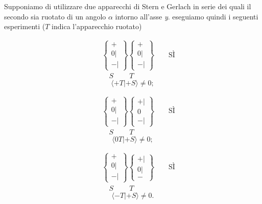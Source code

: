 Supponiamo di utilizzare due apparecchi di Stern e Gerlach in serie dei quali il secondo sia ruotato di un angolo $\alpha$ intorno all'asse \emph{y}. eseguiamo quindi i seguenti esperimenti ($T$ indica l'apparecchio ruotato)


\begin{eqnarray}
& &\begin{Bmatrix}
 + \\ 0 | \\ - |  
\end{Bmatrix}
\begin{Bmatrix}
 + \\ 0 | \\ - |  
\end{Bmatrix} \qquad \text{SÌ}  \\
& & \quad S  \ \qquad T
\label{SG5} \nonumber
\end{eqnarray}
\begin{equation}
\langle +T | +S \rangle \neq 0 ;
\end{equation} 


\begin{eqnarray}
& &\begin{Bmatrix}
 + \\ 0 | \\ - |  
\end{Bmatrix}
\begin{Bmatrix}
 + | \\ 0 \\ - |  
\end{Bmatrix} \qquad \text{SÌ} \\
& & \quad S  \ \qquad T \nonumber
\label{SG6}
\end{eqnarray}
\begin{equation}
\langle 0T | +S \rangle \neq 0 ;
\end{equation} 

\begin{eqnarray}
& & \begin{Bmatrix}
 + \\ 0 | \\ - |  
\end{Bmatrix}
\begin{Bmatrix}
 + | \\ 0 | \\ -   
\end{Bmatrix} \qquad \text{SÌ} \\
& & \quad S  \ \qquad T \nonumber 
\label{SG7}
\end{eqnarray}
\begin{equation}
\langle -T | +S \rangle \neq 0 .
\end{equation}


